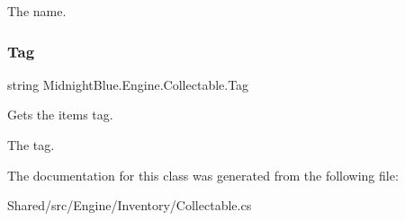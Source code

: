 The name.\hypertarget{class_midnight_blue_1_1_engine_1_1_collectable_aa92d9bc3bf5cf9d01bbb92429293be56}{}\label{class_midnight_blue_1_1_engine_1_1_collectable_aa92d9bc3bf5cf9d01bbb92429293be56} 
\subsubsection{\texorpdfstring{Tag}{Tag}}
{\footnotesize\ttfamily string Midnight\+Blue.\+Engine.\+Collectable.\+Tag\hspace{0.3cm}{\ttfamily [get]}}



Gets the items tag. 

The tag.

The documentation for this class was generated from the following file\+:\begin{DoxyCompactItemize}
\item 
Shared/src/\+Engine/\+Inventory/Collectable.\+cs\end{DoxyCompactItemize}
